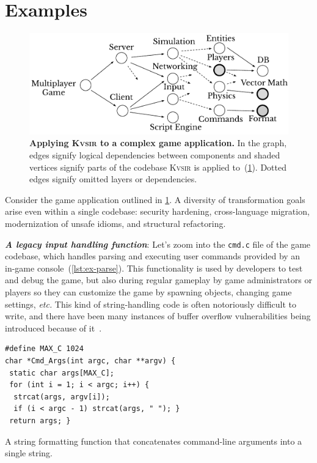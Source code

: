 \documentclass[sigplan,review,anonymous,10pt]{acmart}
\def\etc{{\em etc.}\xspace}
\newcommand{\sys}{{\scshape Kv{\textalpha}sir}\xspace}
\newcommand{\heading}[1]{\vspace{2pt}\noindent\textbf{\emph{#1}}:\enspace}
\newcommand{\ttt}[1]{\texttt{#1}\xspace}
\begin{document}

\section{Examples}
\label{sec:example}

\begin{figure}[t]
\centering
  \includegraphics[width=.9\columnwidth]{figs/kvasir_application.pdf}
  \caption{\textbf{Applying \sys to a complex game application.}
  In the graph, edges signify logical dependencies between components 
  and shaded vertices signify parts of the codebase \sys is applied to~(\cref{sec:example}).
  Dotted edges signify omitted layers or dependencies.
  }
  \label{fig:ex-large-app}
\end{figure}

Consider the game application outlined in \cref{fig:ex-large-app}.
A diversity of transformation goals arise even within a single codebase:
security hardening, cross-language migration, modernization of unsafe idioms,
and structural refactoring.

\heading{A legacy input handling function}
Let's zoom into the \ttt{cmd.c} file of the game codebase,
which handles parsing and executing user commands provided by an in-game console~(\cref{lst:ex-parse}).
This functionality is used by developers to test and debug the game, but also during regular gameplay
by game administrators or players so they can customize the game by spawning objects, changing game settings, \etc
This kind of string-handling code is often notoriously difficult to write,
and there have been many instances of buffer overflow vulnerabilities being introduced because of it~\cite{CVE-2006-3400, CVE-2006-3401, CVE-2007-5248, CVE-2019-1010043}.
\begin{listing}
\begin{verbatim}
#define MAX_C 1024
char *Cmd_Args(int argc, char **argv) {
 static char args[MAX_C];
 for (int i = 1; i < argc; i++) {
  strcat(args, argv[i]);
  if (i < argc - 1) strcat(args, " "); }
 return args; }
\end{verbatim}
\caption{A string formatting function that concatenates command-line arguments into a single string.}
  \label{lst:ex-parse}
\end{listing}
\end{document}
